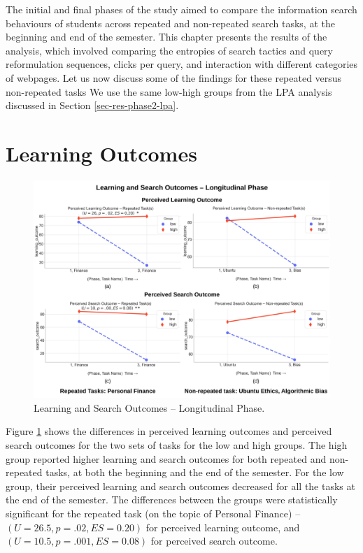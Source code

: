 \documentclass[letterpaper, nobind]{templates/ociamthesis}
\begin{document}
The initial and final phases of the study aimed to compare the information search behaviours of students across repeated and non-repeated search tasks, at the beginning and end of the semester.
This chapter presents the results of the analysis, which involved comparing the entropies of search tactics and query reformulation sequences, clicks per query, and interaction with different categories of webpages.
Let us now discuss some of the findings for these repeated versus non-repeated tasks
We use the same low-high groups from the LPA analysis discussed in Section \ref{sec-res-phase2-lpa}.

\hypertarget{learning-outcomes}{%
\section{Learning Outcomes}\label{learning-outcomes}}

\begin{figure}

{\centering \includegraphics[width=1\linewidth]{figs/rp13-learning-search-outcomes} 

}

\caption[Learning and Search Outcomes -- Longitudinal Phase.]{Learning and Search Outcomes -- Longitudinal Phase.}\label{fig:rp13-learning-search-outcomes}
\end{figure}





Figure \ref{fig:rp13-learning-search-outcomes} shows the differences in perceived learning outcomes and perceived search outcomes for the two sets of tasks for the low and high groups.
The high group reported higher learning and search outcomes for both repeated and non-repeated tasks, at both the beginning and the end of the semester.
For the low group, their perceived learning and search outcomes decreased for all the tasks at the end of the semester.
The differences between the groups were statistically significant for the repeated task (on the topic of Personal Finance) -- \((U = 26.5, p = .02, ES = 0.20)\) for perceived learning outcome, and \((U = 10.5, p = .001, ES = 0.08)\) for perceived search outcome.
\end{document}
